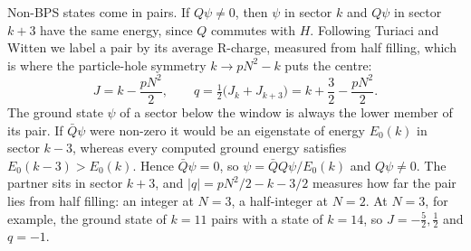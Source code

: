 \documentclass[10pt]{article}
\newcommand{\bQ}{\bar Q}
\begin{document}
Non-BPS states come in pairs. If $Q\psi\ne0$, then $\psi$ in sector $k$ and $Q\psi$ in sector $k+3$ have the
same energy, since $Q$ commutes with $H$. Following Turiaci and Witten \cite{TW} we label a pair by its
average R-charge, measured from half filling, which is where the particle-hole symmetry $k\to pN^2-k$ puts the
centre:
\begin{equation}
J=k-\frac{pN^2}2,\qquad q=\tfrac12\big(J_k+J_{k+3}\big)=k+\frac32-\frac{pN^2}2 .
\label{eq:multipletq}
\end{equation}
The ground state $\psi$ of a sector below the window is always the lower member of its pair. If $\bQ\psi$ were
non-zero it would be an eigenstate of energy $E_0(k)$ in sector $k-3$, whereas every computed ground energy
satisfies $E_0(k-3)>E_0(k)$. Hence $\bQ\psi=0$, so $\psi=\bQ Q\psi/E_0(k)$ and $Q\psi\ne0$. The partner sits in
sector $k+3$, and $|q|=pN^2/2-k-3/2$ measures how far the pair lies from half filling: an integer at $N=3$, a
half-integer at $N=2$. At $N=3$, for example, the ground state of $k=11$ pairs with a state of $k=14$, so
$J=-\tfrac52,\tfrac12$ and $q=-1$.
\end{document}
